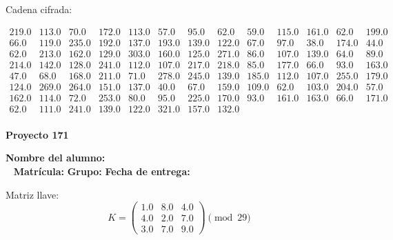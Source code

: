 \documentclass[12pt]{article}
\begin{document}
Cadena cifrada:
\begin{center}
$\begin{array}{lllllllllllll}
219.0 & 113.0 & 70.0 & 172.0 & 113.0 & 57.0 & 95.0 & 62.0 & 59.0 & 115.0 & 161.0 & 62.0 & 199.0\\
66.0 & 119.0 & 235.0 & 192.0 & 137.0 & 193.0 & 139.0 & 122.0 & 67.0 & 97.0 & 38.0 & 174.0 & 44.0\\
62.0 & 213.0 & 162.0 & 129.0 & 303.0 & 160.0 & 125.0 & 271.0 & 86.0 & 107.0 & 139.0 & 64.0 & 89.0\\
214.0 & 142.0 & 128.0 & 241.0 & 112.0 & 107.0 & 217.0 & 218.0 & 85.0 & 177.0 & 66.0 & 93.0 & 163.0\\
47.0 & 68.0 & 168.0 & 211.0 & 71.0 & 278.0 & 245.0 & 139.0 & 185.0 & 112.0 & 107.0 & 255.0 & 179.0\\
124.0 & 269.0 & 264.0 & 151.0 & 137.0 & 40.0 & 67.0 & 159.0 & 109.0 & 62.0 & 103.0 & 204.0 & 57.0\\
162.0 & 114.0 & 72.0 & 253.0 & 80.0 & 95.0 & 225.0 & 170.0 & 93.0 & 161.0 & 163.0 & 66.0 & 171.0\\
62.0 & 111.0 & 241.0 & 139.0 & 122.0 & 321.0 & 157.0 & 132.0\\
\end{array}$
\end{center}

\newpage


\textbf{Proyecto 171}

\textbf{Nombre del alumno:} \underline{\hspace{13cm}}\\\
\vspace{1cm}
\textbf{Matrícula:} \underline{\hspace{4cm}} \hspace{1cm}
\textbf{Grupo:} \underline{\hspace{2cm}}
\textbf{Fecha de entrega:} \underline{\hspace{2cm}}

\medskip

Matriz llave:
\[
K = \begin{pmatrix}
1.0 & 8.0 & 4.0\\
4.0 & 2.0 & 7.0\\
3.0 & 7.0 & 9.0
\end{pmatrix} \pmod{29}
\]
\end{document}
